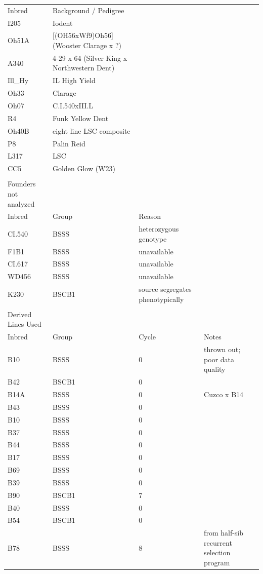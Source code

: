 \begin{table}
\begin{tabular}{ | l | l | l | l | }
	Inbred & Background / Pedigree &  &  \\ 
	I205 & Iodent &  &  \\ 
	Oh51A & [(OH56xWf9)Oh56] (Wooster Clarage x ?) &  &  \\ 
	A340 & 4-29 x 64 (Silver King x Northwestern Dent) &  &  \\ 
	Ill\_Hy & IL High Yield &  &  \\ 
	Oh33 & Clarage &  &  \\ 
	Oh07 & C.I.540xIII.L &  &  \\ 
	R4 & Funk Yellow Dent &  &  \\ 
	Oh40B & eight line LSC composite &  &  \\ 
	P8 & Palin Reid &  &  \\ 
	L317 & LSC &  &  \\ 
	CC5 & Golden Glow (W23) &  &  \\ 
	 &  &  &  \\ 
	Founders not analyzed &  &  &  \\ 
	Inbred & Group & Reason &  \\ 
	CI.540 & BSSS & heterozygous genotype &  \\ 
	F1B1 & BSSS & unavailable &  \\ 
	CI.617 & BSSS & unavailable &  \\ 
	WD456 & BSSS & unavailable &  \\ 
	K230 & BSCB1 & source segregates phenotypically &  \\ 
	 &  &  &  \\ 
	Derived Lines Used &  &  &  \\ 
	Inbred & Group & Cycle & Notes \\ 
	B10 & BSSS & 0 & thrown out; poor data quality \\ 
	B42 & BSCB1 & 0 &  \\ 
	B14A & BSSS & 0 & Cuzco x B14 \\ 
	B43 & BSSS & 0 &  \\ 
	B10 & BSSS & 0 &  \\ 
	B37 & BSSS & 0 &  \\ 
	B44 & BSSS & 0 &  \\ 
	B17 & BSSS & 0 &  \\ 
	B69 & BSSS & 0 &  \\ 
	B39 & BSSS & 0 &  \\ 
	B90 & BSCB1 & 7 &  \\ 
	B40 & BSSS & 0 &  \\ 
	B54 & BSCB1 & 0 &  \\ 
	B78 & BSSS & 8 & from half-sib recurrent selection program \\ 

\end{tabular}
\end{table}
